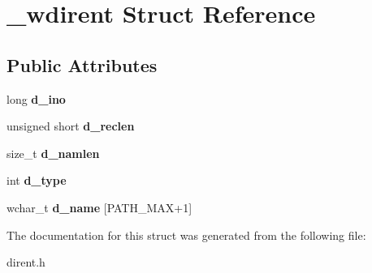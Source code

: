 \hypertarget{struct__wdirent}{\section{\-\_\-wdirent Struct Reference}
\label{struct__wdirent}
}
\subsection*{Public Attributes}
\begin{DoxyCompactItemize}
\item 
\hypertarget{struct__wdirent_ac8cfaf294a0b6a49287d3f384c280c93}{long {\bfseries d\-\_\-ino}}\label{struct__wdirent_ac8cfaf294a0b6a49287d3f384c280c93}

\item 
\hypertarget{struct__wdirent_aff7f360608e576cd18cf11f2caf13ef3}{unsigned short {\bfseries d\-\_\-reclen}}\label{struct__wdirent_aff7f360608e576cd18cf11f2caf13ef3}

\item 
\hypertarget{struct__wdirent_a0050d6131e6fa90206903e216b38799e}{size\-\_\-t {\bfseries d\-\_\-namlen}}\label{struct__wdirent_a0050d6131e6fa90206903e216b38799e}

\item 
\hypertarget{struct__wdirent_a3c3874604ffccbeeaffd96709763cc3b}{int {\bfseries d\-\_\-type}}\label{struct__wdirent_a3c3874604ffccbeeaffd96709763cc3b}

\item 
\hypertarget{struct__wdirent_a5ccfbf6f19313d09437e8ee293a88385}{wchar\-\_\-t {\bfseries d\-\_\-name} \mbox{[}P\-A\-T\-H\-\_\-\-M\-A\-X+1\mbox{]}}\label{struct__wdirent_a5ccfbf6f19313d09437e8ee293a88385}

\end{DoxyCompactItemize}


The documentation for this struct was generated from the following file\-:\begin{DoxyCompactItemize}
\item 
dirent.\-h\end{DoxyCompactItemize}
